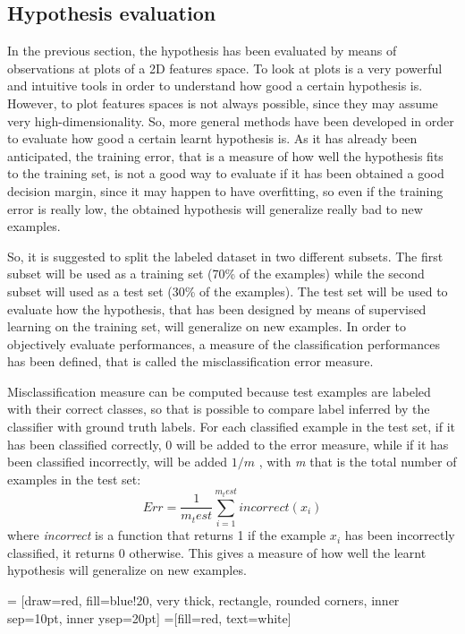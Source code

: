 \documentclass[aps,letterpaper,10pt]{revtex4}
\begin{document}
\subsection{Hypothesis evaluation}
In the previous section, the hypothesis has been evaluated by means of observations at plots of a 2D features space. To look at plots is a very powerful and intuitive tools in order to understand how good a certain hypothesis is. However, to plot features spaces is not always possible, since they may assume very high-dimensionality. So, more general methods have been developed in order to evaluate how good a certain learnt hypothesis is. As it has already been anticipated, the training error, that is a measure of how well the hypothesis fits to the training set, is not a good way to evaluate if it has been obtained a good decision margin, since it may happen to have overfitting, so even if the training error is really low, the obtained hypothesis will generalize really bad to new examples. 

So, it is suggested to split the labeled dataset in two different subsets. The first subset will be used as a training set (70{\%} of the examples) while the second subset will used as a test set (30{\%} of the examples). The test set will be used to evaluate how the hypothesis, that has been designed by means of supervised learning on the training set, will generalize on new examples. In order to objectively evaluate performances, a measure of the classification performances has been defined, that is called the misclassification error measure. 

Misclassification measure can be computed because test examples are labeled with their correct classes, so that is possible to compare label inferred by the classifier with ground truth labels. For each classified example in the test set, if it has been classified correctly, 0 will be added to the error measure, while if it has been classified incorrectly,  will be added $1/m$ , with \textit{m} that is the total number of examples in the test set:
\begin{equation}
Err = \frac{1}{m_test}\sum_{i=1}^{m_test}incorrect( x_{i} )
\end{equation}
where \textit{incorrect} is a function that returns 1 if the example $x_{i}$ has been incorrectly classified,  it returns 0 otherwise.
This gives a measure of how well the learnt hypothesis will generalize on new examples.


 = [draw=red, fill=blue!20, very thick,
    rectangle, rounded corners, inner sep=10pt, inner ysep=20pt]
 =[fill=red, text=white]
\end{document}
